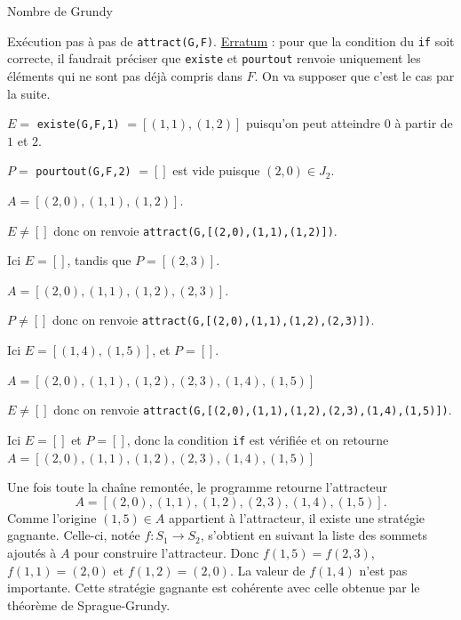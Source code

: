 \begin{exo}[PC][1][devoir]{Nombre de Grundy}
\begin{quest}
{  Exécution pas à pas de \texttt{attract(G,F)}.
      \underline{Erratum} : pour que la condition du \texttt{if} soit correcte, il faudrait préciser que \texttt{existe} et \texttt{pourtout} renvoie uniquement les éléments qui ne sont pas déjà compris dans $F$. On va supposer que c’est le cas par la suite.
  \begin{liste}
    \item $E =$ \texttt{existe(G,F,1)} $= [(1,1),(1,2)]$ puisqu’on peut atteindre $0$ à partir de $1$ et $2$.
    \item $P =$ \texttt{pourtout(G,F,2)} $= []$
    est vide puisque $(2,0) \in J_2$.
    \item $A = [(2,0),(1,1),(1,2)]$.
    \item $E \neq []$ donc on renvoie \texttt{attract(G,[(2,0),(1,1),(1,2)])}.
    \begin{liste}
      \item Ici $E = []$, tandis que $P = [(2,3)]$.
      \item $A = [(2,0),(1,1),(1,2),(2,3)]$.
      \item $P \neq []$ donc on renvoie \texttt{attract(G,[(2,0),(1,1),(1,2),(2,3)])}.
      \begin{liste}
        \item Ici $E = [(1,4),(1,5)]$, et $P = []$.
        \item $A = [(2,0),(1,1),(1,2),(2,3),(1,4),(1,5)]$
        \item $E \neq []$ donc on renvoie \texttt{attract(G,[(2,0),(1,1),(1,2),(2,3),(1,4),(1,5)])}.
        \begin{liste}
          \item Ici $E = []$ et $P = []$, donc la condition \texttt{if} est vérifiée et on retourne $A = [(2,0),(1,1),(1,2),(2,3),(1,4),(1,5)]$
        \end{liste}
      \end{liste}
    \end{liste}
  \end{liste}
  Une fois toute la chaîne remontée, le programme retourne l’attracteur
  $$
  A = [(2,0),(1,1),(1,2),(2,3),(1,4),(1,5)].
  $$
  Comme l’origine $(1,5) \in A$ appartient à l’attracteur, il existe une stratégie gagnante. Celle-ci, notée $f : S_1 \rightarrow S_2$, s’obtient en suivant la liste des sommets ajoutés à $A$ pour construire l’attracteur. Donc $f(1,5) = f(2,3)$, $f(1,1)=(2,0)$ et $f(1,2)=(2,0)$. La valeur de $f(1,4)$ n’est pas importante. Cette stratégie gagnante est cohérente avec celle obtenue par le théorème de Sprague-Grundy.
  }
\end{quest}
\end{exo}

